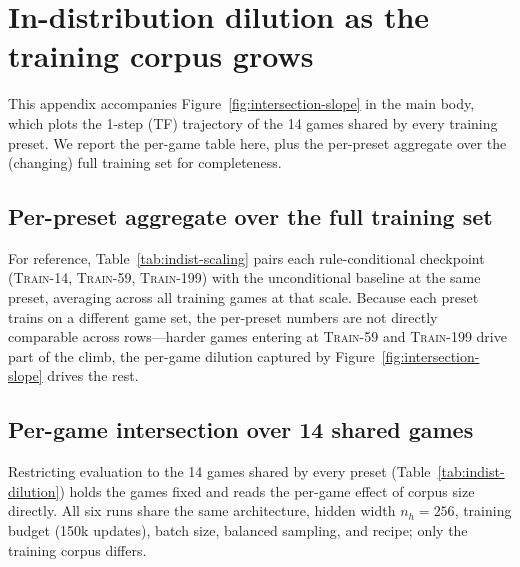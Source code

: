 \section{In-distribution dilution as the training corpus grows}
\label{app:dilution}

This appendix accompanies Figure~\ref{fig:intersection-slope} in the
main body, which plots the 1-step (TF) trajectory of the
14 games shared by every training preset. We report the per-game
table here, plus the per-preset aggregate over the (changing) full
training set for completeness.

\subsection{Per-preset aggregate over the full training set}
\label{app:indist-scaling-aggregate}

For reference,
Table~\ref{tab:indist-scaling} pairs each rule-conditional checkpoint
(\textsc{Train-14}, \textsc{Train-59}, \textsc{Train-199}) with the
unconditional baseline at the same preset, averaging across all
training games at that scale. Because each preset trains on a
different game set, the per-preset numbers are not directly
comparable across rows---harder games entering at \textsc{Train-59}
and \textsc{Train-199} drive part of the climb, the per-game
dilution captured by Figure~\ref{fig:intersection-slope} drives the
rest.

\begin{table}[t]
  \centering
  \caption{\textbf{In-distribution per-cell rollout error as the
    training corpus scales, with the unconditional baseline at each
    scale.} Mean / median across all training games at the given
    preset (each game's number is the per-rollout-step mean across
    all authored levels).}
  \label{tab:indist-scaling}
  \small
  
\end{table}

\subsection{Per-game intersection over 14 shared games}

Restricting evaluation to the 14 games shared by every preset
(Table~\ref{tab:indist-dilution}) holds the games fixed and reads
the per-game effect of corpus size directly. All six runs share
the same architecture, hidden width $n_h{=}256$, training budget
(150k updates), batch size, balanced sampling, and recipe; only
the training corpus differs.

